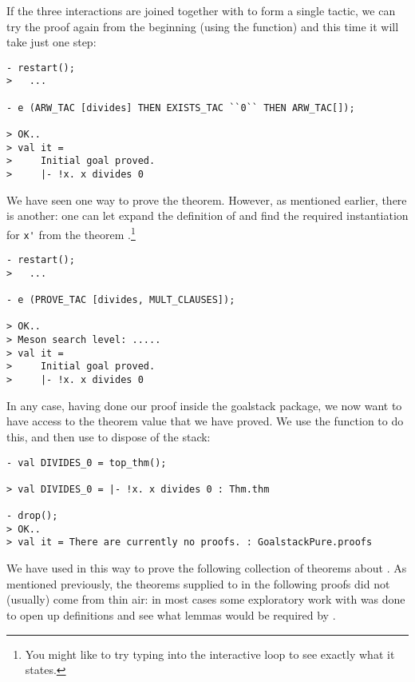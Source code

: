 If the three interactions are joined together with  to
form a single tactic, we can try the proof again from the
beginning (using the  function) and this time it will
take just one step:
\begin{session}\begin{verbatim}
- restart();
>   ...

- e (ARW_TAC [divides] THEN EXISTS_TAC ``0`` THEN ARW_TAC[]);

> OK..
> val it =
>     Initial goal proved.
>     |- !x. x divides 0
\end{verbatim}\end{session}
We have seen one way to prove the theorem. However, as mentioned
earlier, there is another: one can let  expand the
definition of  and find the required instantiation for
\verb+x'+ from the theorem .\footnote{You might
  like to try typing  into the interactive loop
  to see exactly what it states.}
\begin{session}\begin{verbatim}
- restart();
>   ...

- e (PROVE_TAC [divides, MULT_CLAUSES]);

> OK..
> Meson search level: .....
> val it =
>     Initial goal proved.
>     |- !x. x divides 0
\end{verbatim}\end{session}
    In any case, having done our proof inside the goalstack package,
    we now want to have access to the theorem value that we have
    proved.  We use the  function to do this, and then
    use  to dispose of the stack:
\begin{session}\begin{verbatim}
- val DIVIDES_0 = top_thm();

> val DIVIDES_0 = |- !x. x divides 0 : Thm.thm

- drop();
> OK..
> val it = There are currently no proofs. : GoalstackPure.proofs
\end{verbatim}\end{session}

We have used  in this way to prove the following
collection of theorems about . As mentioned previously, the
theorems supplied to  in the following proofs did not
(usually) come from thin air: in most cases some exploratory work with
 was done to open up definitions and see what lemmas would
be required by .

